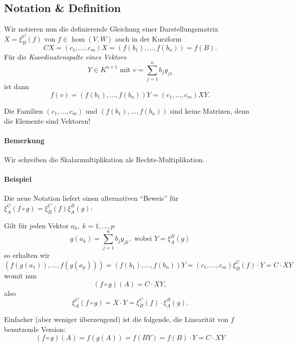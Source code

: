 \subsection{Notation \& Definition}
	\begin{Definition}
		Wir notieren nun die definierende Gleichung einer Darstellungsmatrix $ X=\xi_B^C(f) $ von $ f\in \hom(V,W) $ auch in der Kurzform
		\[
			CX=(c_1,\dots,c_m)X = (f(b_1),\dots,f(b_n)) = f(B).
		\]
		Für die \emph{Koordinatenspalte eines Vektors}
		\[
			Y\in K^{n\times 1} \text{ mit } v=\sum_{j=1}^{n}b_jy_{j1}
		\]
		ist dann
		\[
			f(v) = (f(b_1),\dots,f(b_n))Y = (c_1,\dots,c_m)XY.
		\]
	\end{Definition}
	Die Familien $ (c_1,\dots,c_m) $ und $ (f(b_1),\dots,f(b_n)) $ sind keine Matrizen, denn die Elemente sind Vektoren!

	\paragraph{Bemerkung}
		Wir schreiben die Skalarmultiplikation als Rechts-Multiplikation.
	\paragraph{Beispiel}
		Die neue Notation liefert einen alternativen "`Beweis"' für $ \xi_A^C(f\circ g) = \xi_B^C(f)\xi_A^B(g) $:

		Gilt für jeden Vektor $ a_k,\ k=1,\dots,p $
		\[
			g(a_k) = \sum_{j=1}^{n}b_jy_{jk}, \text{ wobei } Y = \xi_A^B(g)
		\]
		so erhalten wir
		\[
			(f(g(a_1)),\dots, f(g(a_p))) = (f(b_1),\dots , f(b_n))Y = (c_1,\dots,c_m)\xi_B^C(f)\cdot Y = C\cdot XY
		\]
		womit nun
		\[
			(f\circ g)(A) = C\cdot XY,
		\]
		also
		\[
			\xi_A^C(f\circ g) = X\cdot Y = \xi_B^C(f)\cdot \xi_A^B(g).
		\]

		Einfacher (aber weniger überzeugend) ist die folgende, die Linearität von $ f $ benutzende Version:
		\[
			( f\circ g )(A) = f(g(A)) = f(BY) = f(B)\cdot Y = C\cdot XY
		\]
